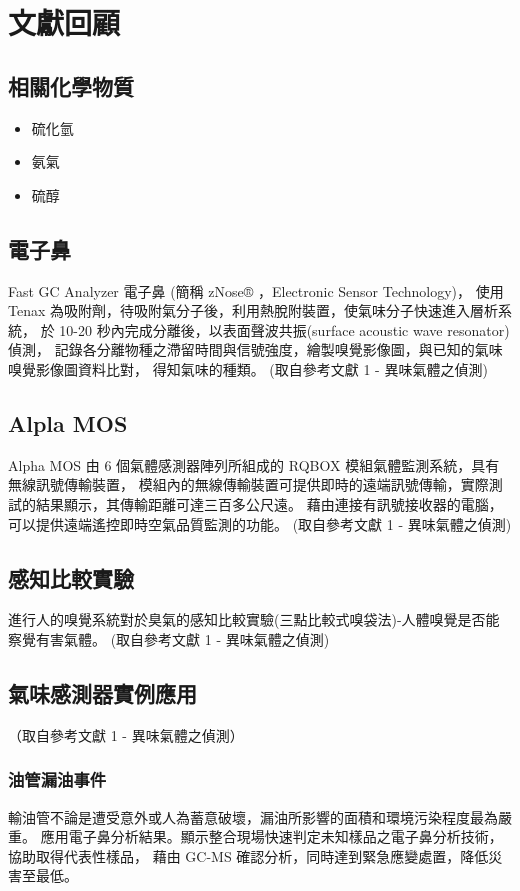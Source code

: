 \chapter{文獻回顧}

\section{相關化學物質}
\begin{itemize}
	\item 硫化氫
	\item 氨氣
	\item 硫醇
\end{itemize}

\section{電子鼻}
Fast GC Analyzer 電子鼻 (簡稱 zNose® ，Electronic Sensor Technology)，
使用 Tenax 為吸附劑，待吸附氣分子後，利用熱脫附裝置，使氣味分子快速進入層析系統，
於 10-20 秒內完成分離後，以表面聲波共振(surface acoustic wave resonator) 偵測，
記錄各分離物種之滯留時間與信號強度，繪製嗅覺影像圖，與已知的氣味嗅覺影像圖資料比對，
得知氣味的種類。 (取自參考文獻 1 - 異味氣體之偵測) 

\section{Alpla MOS}
Alpha MOS 由 6 個氣體感測器陣列所組成的 RQBOX 模組氣體監測系統，具有無線訊號傳輸裝置，
模組內的無線傳輸裝置可提供即時的遠端訊號傳輸，實際測試的結果顯示，其傳輸距離可達三百多公尺遠。
藉由連接有訊號接收器的電腦，可以提供遠端遙控即時空氣品質監測的功能。
(取自參考文獻 1 - 異味氣體之偵測) 

\section{感知比較實驗}
進行人的嗅覺系統對於臭氣的感知比較實驗(三點比較式嗅袋法)-人體嗅覺是否能察覺有害氣體。
(取自參考文獻 1 - 異味氣體之偵測) 

\section{氣味感測器實例應用}
（取自參考文獻 1 - 異味氣體之偵測）\\
	\subsection{油管漏油事件}
	輸油管不論是遭受意外或人為蓄意破壞，漏油所影響的面積和環境污染程度最為嚴重。
	應用電子鼻分析結果。顯示整合現場快速判定未知樣品之電子鼻分析技術，協助取得代表性樣品，
	藉由 GC-MS 確認分析，同時達到緊急應變處置，降低災害至最低。
